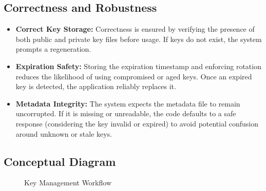 \documentclass[12pt]{article}
\begin{document}
\subsection{Correctness and Robustness}
\begin{itemize}
    \item \textbf{Correct Key Storage:} 
    Correctness is ensured by verifying the presence of both public and private key files before usage. If keys do not exist, the system prompts a regeneration.
    
    \item \textbf{Expiration Safety:}
    Storing the expiration timestamp and enforcing rotation reduces the likelihood of using compromised or aged keys. Once an expired key is detected, the application reliably replaces it.

    \item \textbf{Metadata Integrity:}
    The system expects the metadata file to remain uncorrupted. If it is missing or unreadable, the code defaults to a safe response (considering the key invalid or expired) to avoid potential confusion around unknown or stale keys.
\end{itemize}

\subsection{Conceptual Diagram}

\begin{figure}[h!]
\centering
{}
\caption{Key Management Workflow}
\label{fig:key_management_workflow}
\end{figure}
\end{document}
